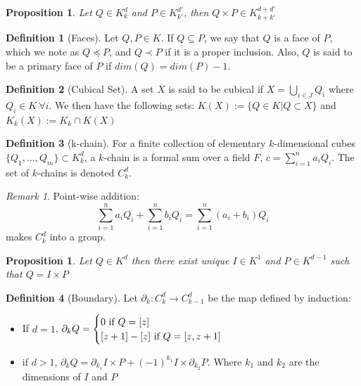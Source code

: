 \documentclass{article}
\theoremstyle{plain}
\newtheorem{prop}[thm]{Proposition}
\theoremstyle{definition}
\newtheorem{definition}{Definition}[section]
\theoremstyle{remark}
\newtheorem{remark}{Remark}[section]
\begin{document}
\begin{prop}
Let $Q\in K_k^d$ and $P\in K_{k'}^{d'}$, then $Q \times P \in K_{k+k'}^{d+d'}$
\end{prop}

\begin{definition}[Faces]
Let $Q,P \in K$. If $Q\subseteq P$, we say that $Q$ is a face of $P$, which we note as $Q \preceq P$, and $Q \prec P$ if it is a proper inclusion. Also, $Q$ is said to be a primary face of $P$ if $dim(Q) = dim(P) - 1$.
\end{definition}

\begin{definition}[Cubical Set]
A set $X$ is said to be cubical if $X= \bigcup_{i\in J} Q_i $ where $Q_i \in K \ \forall i $. We then have the following sets: $K(X) := \{ Q \in K | Q \subset X \}$ and $K_k(X) := K_k \cap K(X)$
\end{definition}

\begin{definition}[k-chain]
For a finite collection of elementary $k$-dimensional cubes $\{ Q_1, \dots , Q_m \} \subset K_k^d$, a $k$-chain is a formal sum over a field $F$, $c=\sum_{i=1}^n a_i Q_i$. The set of $k$-chains is denoted $C_k^d$.
\end{definition}

\begin{remark}
Point-wise addition: \[ \sum_{i=1}^n a_i Q_i + \sum_{i=1}^n b_i Q_i = \sum_{i=1}^n (a_i+b_i) Q_i \] makes $C_k^d$ into a group.
\end{remark}

\begin{prop}
Let $Q \in K^d$ then there exist unique $I \in K^1$ and $P \in K^{d-1}$ such that $Q= I \times P$
\end{prop}

\begin{definition}[Boundary]
Let $\partial_k : C_k^d \to C_{k-1}^d$ be the map defined by induction: 
\begin{itemize}
    \item If $d=1$, $\partial_k Q =
    \begin{cases}
    0 \ \textmd{if} \ Q=[z] \\
    [z+1] - [z] \ \textmd{if} \ Q=[z,z+1]
    \end{cases}$
    \item if $d>1$, $\partial_k Q = \partial_{k_1} I \times P + (-1)^{k_1} I \times \partial_{k_2}P $. Where $k_1$ and $k_2$ are the dimensions of $I$ and $P$  
\end{itemize}
\end{definition}
\end{document}
